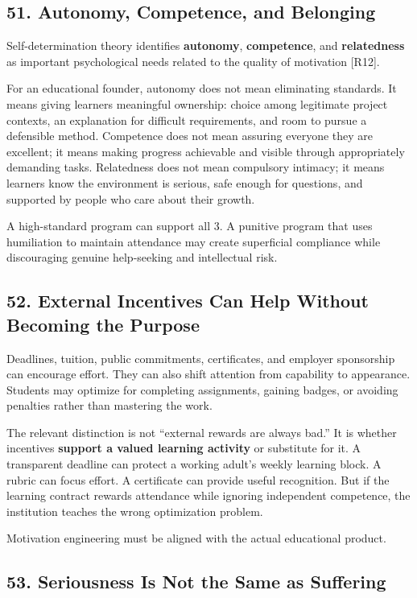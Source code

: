 \subsection*{51. Autonomy, Competence, and Belonging}

Self-determination theory identifies \textbf{autonomy}, \textbf{competence}, and \textbf{relatedness} as important psychological needs related to the quality of motivation [R12].

For an educational founder, autonomy does not mean eliminating standards. It means giving learners meaningful ownership: choice among legitimate project contexts, an explanation for difficult requirements, and room to pursue a defensible method. Competence does not mean assuring everyone they are excellent; it means making progress achievable and visible through appropriately demanding tasks. Relatedness does not mean compulsory intimacy; it means learners know the environment is serious, safe enough for questions, and supported by people who care about their growth.

A high-standard program can support all 3. A punitive program that uses humiliation to maintain attendance may create superficial compliance while discouraging genuine help-seeking and intellectual risk.

\subsection*{52. External Incentives Can Help Without Becoming the Purpose}

Deadlines, tuition, public commitments, certificates, and employer sponsorship can encourage effort. They can also shift attention from capability to appearance. Students may optimize for completing assignments, gaining badges, or avoiding penalties rather than mastering the work.

The relevant distinction is not ``external rewards are always bad.'' It is whether incentives \textbf{support a valued learning activity} or substitute for it. A transparent deadline can protect a working adult's weekly learning block. A rubric can focus effort. A certificate can provide useful recognition. But if the learning contract rewards attendance while ignoring independent competence, the institution teaches the wrong optimization problem.

Motivation engineering must be aligned with the actual educational product.

\subsection*{53. Seriousness Is Not the Same as Suffering}

